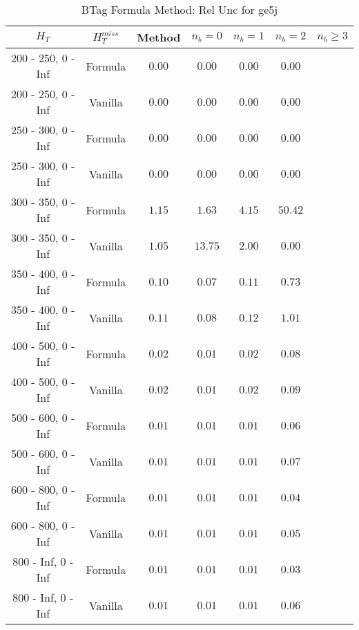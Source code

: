 \begin{longtable}{ | c | c | c | c | c | c | c | }
\caption{BTag Formula Method: Rel Unc for ge5j} \label{tab:ge5j} \\    \hline 
$H_{T}$ & $H_{T}^{miss}$ & Method & $n_{b} = 0$ & $n_{b} = 1$ & $n_{b} = 2$ & $n_{b} \ge 3$ \\ \hline 200 -  250,    0 -  Inf & Formula  & $  0.00 $ & $  0.00 $ & $  0.00 $ & $  0.00 $  \\  
 200 -  250,    0 -  Inf & Vanilla  & $  0.00 $ & $  0.00 $ & $  0.00 $ & $  0.00 $  \\ \hline 
 250 -  300,    0 -  Inf & Formula  & $  0.00 $ & $  0.00 $ & $  0.00 $ & $  0.00 $  \\  
 250 -  300,    0 -  Inf & Vanilla  & $  0.00 $ & $  0.00 $ & $  0.00 $ & $  0.00 $  \\ \hline 
 300 -  350,    0 -  Inf & Formula  & $  1.15 $ & $  1.63 $ & $  4.15 $ & $ 50.42 $  \\  
 300 -  350,    0 -  Inf & Vanilla  & $  1.05 $ & $ 13.75 $ & $  2.00 $ & $  0.00 $  \\ \hline 
 350 -  400,    0 -  Inf & Formula  & $  0.10 $ & $  0.07 $ & $  0.11 $ & $  0.73 $  \\  
 350 -  400,    0 -  Inf & Vanilla  & $  0.11 $ & $  0.08 $ & $  0.12 $ & $  1.01 $  \\ \hline 
 400 -  500,    0 -  Inf & Formula  & $  0.02 $ & $  0.01 $ & $  0.02 $ & $  0.08 $  \\  
 400 -  500,    0 -  Inf & Vanilla  & $  0.02 $ & $  0.01 $ & $  0.02 $ & $  0.09 $  \\ \hline 
 500 -  600,    0 -  Inf & Formula  & $  0.01 $ & $  0.01 $ & $  0.01 $ & $  0.06 $  \\  
 500 -  600,    0 -  Inf & Vanilla  & $  0.01 $ & $  0.01 $ & $  0.01 $ & $  0.07 $  \\ \hline 
 600 -  800,    0 -  Inf & Formula  & $  0.01 $ & $  0.01 $ & $  0.01 $ & $  0.04 $  \\  
 600 -  800,    0 -  Inf & Vanilla  & $  0.01 $ & $  0.01 $ & $  0.01 $ & $  0.05 $  \\ \hline 
 800 -  Inf,    0 -  Inf & Formula  & $  0.01 $ & $  0.01 $ & $  0.01 $ & $  0.03 $  \\  
 800 -  Inf,    0 -  Inf & Vanilla  & $  0.01 $ & $  0.01 $ & $  0.01 $ & $  0.06 $  \\ \hline 
    \hline 
    \hline 
\end{longtable}
